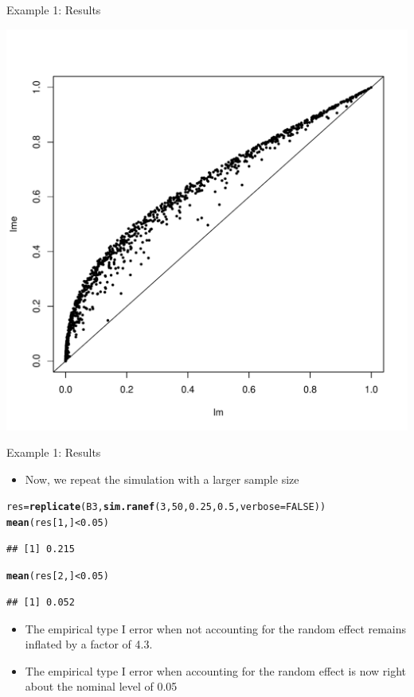 \documentclass[xcolor=x11names,compress]{beamer}\usepackage[]{graphicx}\usepackage[]{color}
\makeatletter
\newcommand{\hlnum}[1]{\textcolor[rgb]{0.686,0.059,0.569}{#1}}%
\newcommand{\hlopt}[1]{\textcolor[rgb]{0,0,0}{#1}}%
\newcommand{\hlstd}[1]{\textcolor[rgb]{0.345,0.345,0.345}{#1}}%
\newcommand{\hlkwb}[1]{\textcolor[rgb]{0.69,0.353,0.396}{#1}}%
\newcommand{\hlkwc}[1]{\textcolor[rgb]{0.333,0.667,0.333}{#1}}%
\newcommand{\hlkwd}[1]{\textcolor[rgb]{0.737,0.353,0.396}{\textbf{#1}}}%
\newenvironment{kframe}{%
 \def\at@end@of@kframe{}%
 \ifinner\ifhmode%
  \def\at@end@of@kframe{\end{minipage}}%
  \begin{minipage}{\columnwidth}%
 \fi\fi%
 \def\FrameCommand##1{\hskip\@totalleftmargin \hskip-\fboxsep
 \colorbox{shadecolor}{##1}\hskip-\fboxsep
     \hskip-\linewidth \hskip-\@totalleftmargin \hskip\columnwidth}%
 \MakeFramed {\advance\hsize-\width
   \@totalleftmargin\z@ \linewidth\hsize
   \@setminipage}}%
 {\par\unskip\endMakeFramed%
 \at@end@of@kframe}
\newenvironment{knitrout}{}{} %
\makeatother
\begin{document}
\begin{frame}[fragile]{Example 1: Results}
\begin{knitrout}\tiny
{}\color{fgcolor}

{\centering \includegraphics[width=.6\linewidth]{figure/beamer-unnamed-chunk-34-1} 

}



\end{knitrout}
\end{frame}

\begin{frame}[fragile]{Example 1: Results}
  \begin{itemize}
  \item Now, we repeat the simulation with a larger sample size
  \end{itemize}
\begin{knitrout}\tiny
{}\color{fgcolor}\begin{kframe}
\begin{alltt}
\hlstd{res}\hlkwb{=}\hlkwd{replicate}\hlstd{(B3,}\hlkwd{sim.ranef}\hlstd{(}\hlnum{3}\hlstd{,}\hlnum{50}\hlstd{,}\hlnum{0.25}\hlstd{,}\hlnum{0.5}\hlstd{,}\hlkwc{verbose}\hlstd{=}\hlnum{FALSE}\hlstd{))}
\hlkwd{mean}\hlstd{(res[}\hlnum{1}\hlstd{,]}\hlopt{<}\hlnum{0.05}\hlstd{)}
\end{alltt}
\begin{verbatim}
## [1] 0.215
\end{verbatim}
\begin{alltt}
\hlkwd{mean}\hlstd{(res[}\hlnum{2}\hlstd{,]}\hlopt{<}\hlnum{0.05}\hlstd{)}
\end{alltt}
\begin{verbatim}
## [1] 0.052
\end{verbatim}
\end{kframe}
\end{knitrout}
\begin{itemize}
\item The empirical type I error when not accounting for the random effect
      remains inflated by a factor of  4.3.
      \item The empirical type I error  when accounting for the random effect is now right about the nominal level of 0.05
\end{itemize}
 
\end{frame}
\end{document}

